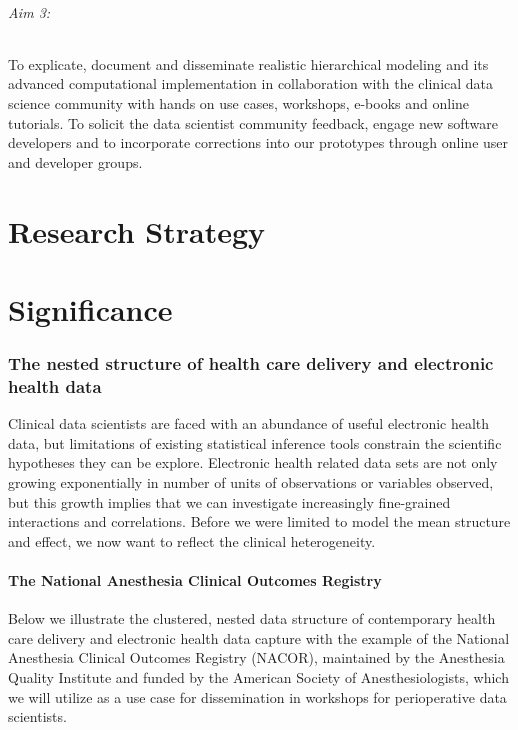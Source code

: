 \documentclass[11pt,notitlepage]{article}
\begin{document}
\paragraph*{Aim 3:} To explicate, document and disseminate realistic hierarchical 
modeling and its advanced computational implementation in collaboration with the 
clinical data science community with hands on use cases, workshops, e-books and 
online tutorials. To solicit the data scientist community feedback, engage new 
software developers and to incorporate corrections into our prototypes through 
online user and developer groups.

\part*{Research Strategy}

\part*{Significance}

\section*{The nested structure of health care delivery and electronic health data}
Clinical data scientists are faced with an abundance of useful electronic health data, 
but limitations of existing statistical inference tools constrain the scientific 
hypotheses they can be explore. Electronic health related data sets 
are not only growing exponentially in number of units of observations or 
variables observed, but this growth implies that we can investigate increasingly fine-grained interactions and correlations. Before we were limited to model the mean structure and effect, we now want to reflect the clinical heterogeneity.  

\subsection*{The National Anesthesia Clinical Outcomes Registry}
Below we illustrate the clustered, nested data structure of contemporary health 
care delivery and electronic health data capture with the example of the 
National Anesthesia Clinical Outcomes Registry (NACOR), maintained by the 
Anesthesia Quality Institute and funded by the American Society of 
Anesthesiologists, which we will utilize as a use case for dissemination in 
workshops for perioperative data scientists.
\end{document}
